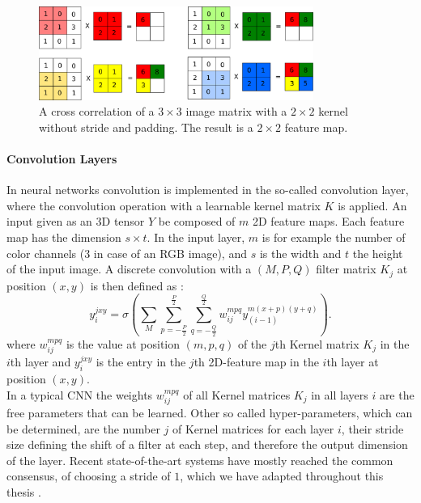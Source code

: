 \begin{figure}
	\centering
    	\includegraphics[width=0.8\textwidth]{imgs/convolution.png} 
    \caption[A cross correlation of a $3\times3$ image matrix with a $2\times2$ kernel.]{A cross correlation of a $3\times3$ image matrix with a $2\times2$ kernel without stride and padding. The result is a $2\times2$ feature map.}
	\label{fig:conv}
\end{figure}

\paragraph{Convolution Layers} \label{c:convlayers}

In neural networks convolution is implemented in the so-called convolution layer, where the convolution operation with a learnable kernel matrix $K$ is applied. 
An input given as an 3D tensor $Y$ be composed of $m$ 2D feature maps. Each feature map has the dimension $s \times t$. 
In the input layer, $m$ is for example the number of color channels (3 in case of an RGB image), and $s$ is the width and $t$ the height of the input image. 
A discrete convolution with a $(M , P , Q)$ filter matrix $K_j$ at position $(x,y)$ is then defined as : 
\[
y_{i}^{jxy} = \sigma(\sum_M \sum_{p=-\frac{P}{2}}^{\frac{P}{2}} \sum_{q=-\frac{Q}{2}}^{\frac{Q}{2}} w_{ij}^{mpq} y_{(i-1)}^{m(x+p)(y+q)}) .
\]
where $w_{ij}^{mpq}$ is the value at position $(m,p,q)$ of the $j$th Kernel matrix $K_j$ in the $i$th layer and $y_{i}^{jxy}$ is the entry in the $j$th 2D-feature map in the $i$th layer at position $(x, y)$.\\
In a typical CNN the weights $w_{ij}^{mpq}$ of all Kernel matrices $K_j$ in all layers $i$ are the free parameters that can be learned. 
Other so called hyper-parameters, which can be determined, are the number $j$ of Kernel matrices for each layer $i$, their stride size defining the shift of a filter at each step, and therefore the output dimension of the layer.
Recent state-of-the-art systems have mostly reached the common consensus, of choosing a stride of $1$, which we have adapted throughout this thesis \cite{simonyan2014very}.


